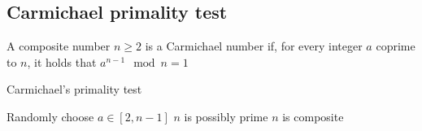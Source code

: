 \subsection{Carmichael primality test}
\begin{definition}
    A composite number $n\geq 2$ is a Carmichael number if, for every integer $a$ coprime to $n$, it holds that $a^{n-1} \mod n = 1$
\end{definition}
\begin{algorithm}[H]
    \caption{Carmichael's primality test}
    \begin{algorithmic}[1]
        \State Randomly choose $a\in[2,n-1]$
            \State $n$ is possibly prime 
        \Else 
            \State $n$ is composite
        \EndIf
    \end{algorithmic}
\end{algorithm} 

